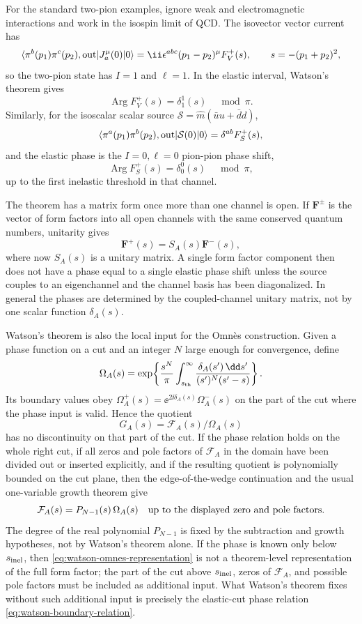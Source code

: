 For the standard two-pion examples, ignore weak and electromagnetic
interactions and work in the isospin limit of QCD.  The isovector vector
current has
\[
  \langle \pi^b(p_1)\pi^c(p_2),{\rm out}|
  J^\mu_a(0)|0\rangle
  =
  \ii\epsilon^{abc}(p_1-p_2)^\mu F_V^+(s),
  \qquad s=-(p_1+p_2)^2,
\]
so the two-pion state has \(I=1\) and \(\ell=1\).  In the elastic interval,
Watson's theorem gives
\[
  \operatorname{Arg}F_V^+(s)=\delta^1_1(s)\quad \bmod \pi .
\]
Similarly, for the isoscalar scalar source
\(\mathcal S=\widehat m(\bar u u+\bar d d)\),
\[
  \langle \pi^a(p_1)\pi^b(p_2),{\rm out}|
  \mathcal S(0)|0\rangle
  =
  \delta^{ab}F_S^+(s),
\]
and the elastic phase is the \(I=0,\ell=0\) pion-pion phase shift,
\[
  \operatorname{Arg}F_S^+(s)=\delta^0_0(s)\quad \bmod \pi ,
\]
up to the first inelastic threshold in that channel.

The theorem has a matrix form once more than one channel is open.  If
\(\mathbf F^\pm\) is the vector of form factors into all open channels with
the same conserved quantum numbers, unitarity gives
\[
  \mathbf F^+(s)=S_A(s)\mathbf F^-(s),
\]
where now \(S_A(s)\) is a unitary matrix.  A single form factor component then
does not have a phase equal to a single elastic phase shift unless the source
couples to an eigenchannel and the channel basis has been diagonalized.  In
general the phases are determined by the coupled-channel unitary matrix, not
by one scalar function \(\delta_A(s)\).

Watson's theorem is also the local input for the Omn\`es construction.  Given
a phase function on a cut and an integer \(N\) large enough for convergence,
define
\begin{equation}
  \Omega_A(s)
  =
  \exp\!\left\{
    \frac{s^N}{\pi}
    \int_{s_{\rm th}}^\infty
    \frac{\delta_A(s')\,\dd s'}{(s')^N(s'-s)}
  \right\}.
  \label{eq:watson-omnes-function}
\end{equation}
Its boundary values obey
\(\Omega_A^+(s)=\ee^{2\ii\delta_A(s)}\Omega_A^-(s)\) on the part of the cut
where the phase input is valid.  Hence the quotient
\[
  G_A(s)=\mathcal F_A(s)/\Omega_A(s)
\]
has no discontinuity on that part of the cut.  If the phase relation holds on
the whole right cut, if all zeros and pole factors of \(\mathcal F_A\) in the
domain have been divided out or inserted explicitly, and if the resulting
quotient is polynomially bounded on the cut plane, then the edge-of-the-wedge
continuation and the usual one-variable growth theorem give
\begin{equation}
  \mathcal F_A(s)
  =
  P_{N-1}(s)\,
  \Omega_A(s)
  \quad
  \hbox{up to the displayed zero and pole factors}.
  \label{eq:watson-omnes-representation}
\end{equation}
The degree of the real polynomial \(P_{N-1}\) is fixed by the subtraction and
growth hypotheses, not by Watson's theorem alone.  If the phase is known only
below \(s_{\rm inel}\), then
\eqref{eq:watson-omnes-representation} is not a theorem-level representation
of the full form factor; the part of the cut above \(s_{\rm inel}\), zeros of
\(\mathcal F_A\), and possible pole factors must be included as additional
input.  What Watson's theorem fixes without such additional input is precisely
the elastic-cut phase relation \eqref{eq:watson-boundary-relation}.

